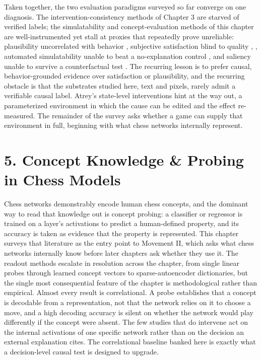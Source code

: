 \documentclass[conference]{IEEEtran}
\begin{document}
Taken together, the two evaluation paradigms surveyed so far converge on one diagnosis. The intervention-consistency methods of Chapter 3 are starved of verified labels; the simulatability and concept-evaluation methods of this chapter are well-instrumented yet stall at proxies that repeatedly prove unreliable: plausibility uncorrelated with behavior \cite{ref18}, subjective satisfaction blind to quality \cite{ref25}, \cite{ref33}, automated simulatability unable to beat a no-explanation control \cite{ref26}, and saliency unable to survive a counterfactual test \cite{ref32}. The recurring lesson is to prefer causal, behavior-grounded evidence over satisfaction or plausibility, and the recurring obstacle is that the substrates studied here, text and pixels, rarely admit a verifiable causal label. Atrey's state-level interventions \cite{ref32} hint at the way out, a parameterized environment in which the cause can be edited and the effect re-measured. The remainder of the survey asks whether a game can supply that environment in full, beginning with what chess networks internally represent.

\section*{5. Concept Knowledge \& Probing in Chess Models}
Chess networks demonstrably encode human chess concepts, and the dominant way to read that knowledge out is concept probing: a classifier or regressor is trained on a layer's activations to predict a human-defined property, and its accuracy is taken as evidence that the property is represented. This chapter surveys that literature as the entry point to Movement II, which asks what chess networks internally know before later chapters ask whether they use it. The readout methods escalate in resolution across the chapter, from single linear probes through learned concept vectors to sparse-autoencoder dictionaries, but the single most consequential feature of the chapter is methodological rather than empirical. Almost every result is correlational. A probe establishes that a concept is decodable from a representation, not that the network relies on it to choose a move, and a high decoding accuracy is silent on whether the network would play differently if the concept were absent. The few studies that do intervene act on the internal activations of one specific network rather than on the decision an external explanation cites. The correlational baseline banked here is exactly what a decision-level causal test is designed to upgrade.
\end{document}
